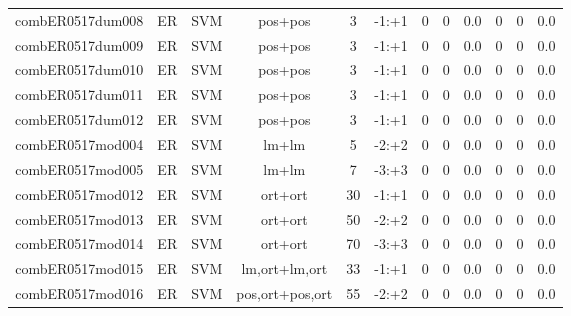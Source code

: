 \documentclass[a4paper]{article}
\begin{document}
\begin{landscape}
\begin{center}
\begin{tabular}{ |c|c|c|c|c|c|c|c|c|c|c|c|}
 
 	
 	\small{ combER0517dum008 } & ER & SVM & pos+pos  &  3 &  -1:+1  &  0 & 0 & 0.0  &  0 & 0 & 0.0 \\
 	

 
 	
 	\small{ combER0517dum009 } & ER & SVM & pos+pos  &  3 &  -1:+1  &  0 & 0 & 0.0  &  0 & 0 & 0.0 \\
 	

 
 	
 	\small{ combER0517dum010 } & ER & SVM & pos+pos  &  3 &  -1:+1  &  0 & 0 & 0.0  &  0 & 0 & 0.0 \\
 	

 
 	
 	\small{ combER0517dum011 } & ER & SVM & pos+pos  &  3 &  -1:+1  &  0 & 0 & 0.0  &  0 & 0 & 0.0 \\
 	

 
 	
 	\small{ combER0517dum012 } & ER & SVM & pos+pos  &  3 &  -1:+1  &  0 & 0 & 0.0  &  0 & 0 & 0.0 \\
 	

 
 	
 	\small{ combER0517mod004 } & ER & SVM & lm+lm  &  5 &  -2:+2  &  0 & 0 & 0.0  &  0 & 0 & 0.0 \\
 	

 
 	
 	\small{ combER0517mod005 } & ER & SVM & lm+lm  &  7 &  -3:+3  &  0 & 0 & 0.0  &  0 & 0 & 0.0 \\
 	

 
 	
 	\small{ combER0517mod012 } & ER & SVM & ort+ort  &  30 &  -1:+1  &  0 & 0 & 0.0  &  0 & 0 & 0.0 \\
 	

 
 	
 	\small{ combER0517mod013 } & ER & SVM & ort+ort  &  50 &  -2:+2  &  0 & 0 & 0.0  &  0 & 0 & 0.0 \\
 	

 
 	
 	\small{ combER0517mod014 } & ER & SVM & ort+ort  &  70 &  -3:+3  &  0 & 0 & 0.0  &  0 & 0 & 0.0 \\
 	

 
 	
 	\small{ combER0517mod015 } & ER & SVM & lm,ort+lm,ort  &  33 &  -1:+1  &  0 & 0 & 0.0  &  0 & 0 & 0.0 \\
 	

 
 	
 	\small{ combER0517mod016 } & ER & SVM & pos,ort+pos,ort  &  55 &  -2:+2  &  0 & 0 & 0.0  &  0 & 0 & 0.0 \\
 	


\end{tabular}
\end{center}
\end{landscape}
\end{document}
